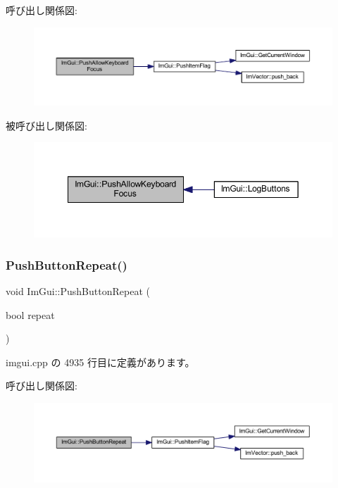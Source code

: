 呼び出し関係図\+:\nopagebreak
\begin{figure}[H]
\begin{center}
\leavevmode
\includegraphics[width=350pt]{namespace_im_gui_adf7c3cfdcbb06617bb70ff1526d064f4_cgraph}
\end{center}
\end{figure}
被呼び出し関係図\+:\nopagebreak
\begin{figure}[H]
\begin{center}
\leavevmode
\includegraphics[width=349pt]{namespace_im_gui_adf7c3cfdcbb06617bb70ff1526d064f4_icgraph}
\end{center}
\end{figure}
\mbox{\label{namespace_im_gui_a61d3e0191d67bedaf45f0178f87e3125}} 
\subsubsection{\texorpdfstring{Push\+Button\+Repeat()}{PushButtonRepeat()}}
{\footnotesize\ttfamily void Im\+Gui\+::\+Push\+Button\+Repeat (\begin{DoxyParamCaption}\item[{bool}]{repeat }\end{DoxyParamCaption})}



 imgui.\+cpp の 4935 行目に定義があります。

呼び出し関係図\+:\nopagebreak
\begin{figure}[H]
\begin{center}
\leavevmode
\includegraphics[width=350pt]{namespace_im_gui_a61d3e0191d67bedaf45f0178f87e3125_cgraph}
\end{center}
\end{figure}
\mbox{\label{namespace_im_gui_a11c8bd8676e1281e15b24c9615b6904a}} 
